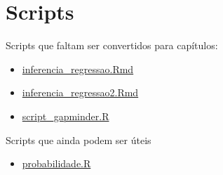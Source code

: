\documentclass[10pt,a4paper]{book}
\providecommand{\tightlist}{%
  \setlength{\itemsep}{0pt}\setlength{\parskip}{0pt}}
\begin{document}
\chapter{Scripts}\label{scripts}

Scripts que faltam ser convertidos para capítulos:

\begin{itemize}
\tightlist
\item
  \href{scripts/inferencia_regressao.Rmd}{inferencia\_regressao.Rmd}
\item
  \href{scripts/inferencia_regressao2.Rmd}{inferencia\_regressao2.Rmd}
\item
  \href{scripts/script_gapminder.R}{script\_gapminder.R}
\end{itemize}

Scripts que ainda podem ser úteis

\begin{itemize}
\tightlist
\item
  \href{scripts/probabilidade.R}{probabilidade.R}
\end{itemize}
\end{document}
